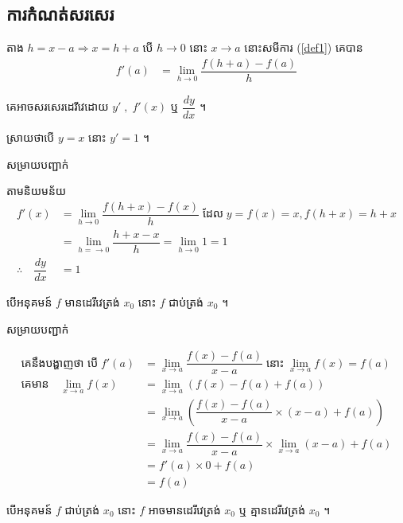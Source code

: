 \documentclass[12pt,fleqn]{book} %
\newcommand{\solution}{{\begin{center}\kml \color{blue} សម្រាយបញ្ជាក់\end{center} }}
\begin{document}
\subsection{ការកំណត់សរសេរ}
តាង $h=x-a\Longrightarrow x=h+a$ បើ $h\longrightarrow 0$ នោះ $x\longrightarrow a$ នោះសមីការ (\ref{def1}) គេបាន
\begin{align}\label{def2}
f'(a)&=\lim_{h\to 0}\dfrac{f(h+a)-f(a)}{h}
\end{align}
\begin{notation}
គេអាចសរសេរដេរីវេដោយ $y' \;, \; f'(x)$ ឬ $\dfrac{dy}{dx}$ ។ 
\end{notation}
\begin{example}
ស្រាយថាបើ $y=x$ នោះ $y'=1$ ។
\solution 
តាមនិយមន័យ 
\begin{align*}
f'(x)&=\lim_{h\to 0}\dfrac{f(h+x)-f(x)}{h} \;\text {ដែល}\; y=f(x)=x ,f(h+x)=h+x\\
&=\lim_{h=\to 0}\dfrac{h+x-x}{h}=\lim_{h\to 0}1=1\\
\therefore \quad \dfrac{dy}{dx}&=1
\end{align*}
\end{example}
\begin{theorem}
បើអនុគមន៍ $f$ មានដេរីវេត្រង់ $x_0$ នោះ $f$ ជាប់ត្រង់ $x_0$ ។
\end{theorem}
\solution 
\begin{align*}
\text{គេនឹងបង្ហាញថា បើ} \; f'(a)&=\lim_{x\to a}\dfrac{f(x)-f(a)}{x-a} \; \text{នោះ}  \;  \lim_{x\to a}f(x)=f(a) \\
\text{គេមាន} \quad \lim_{x\to a}f(x)&=\lim_{x\to a}\left(f(x)-f(a)+f(a) \right)\\
&=\lim_{x\to a}\left(\dfrac{f(x)-f(a)}{x-a}\times (x-a)+f(a) \right)\\
&=\lim_{x\to a}\dfrac{f(x)-f(a)}{x-a}\times \lim_{x\to a}(x-a)+f(a)\\
&=f'(a)\times 0+f(a)\\
&=f(a)
\end{align*}
\begin{notation}
បើអនុគមន៍ $f$ ជាប់ត្រង់ $x_0$ នោះ $f$ អាចមានដេរីវេត្រង់ $x_0$ ឬ គ្មានដេរីវេត្រង់ $x_0$ ។
\end{notation}
\end{document}
